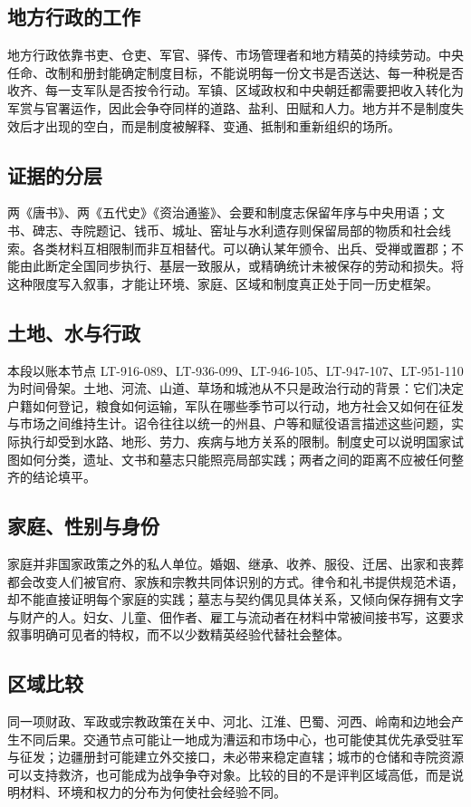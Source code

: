\subsection{地方行政的工作}
地方行政依靠书吏、仓吏、军官、驿传、市场管理者和地方精英的持续劳动。中央任命、改制和册封能确定制度目标，不能说明每一份文书是否送达、每一种税是否收齐、每一支军队是否按令行动。军镇、区域政权和中央朝廷都需要把收入转化为军赏与官署运作，因此会争夺同样的道路、盐利、田赋和人力。地方并不是制度失效后才出现的空白，而是制度被解释、变通、抵制和重新组织的场所。

\subsection{证据的分层}
两《唐书》、两《五代史》《资治通鉴》、会要和制度志保留年序与中央用语；文书、碑志、寺院题记、钱币、城址、窑址与水利遗存则保留局部的物质和社会线索。各类材料互相限制而非互相替代。可以确认某年颁令、出兵、受禅或置郡；不能由此断定全国同步执行、基层一致服从，或精确统计未被保存的劳动和损失。将这种限度写入叙事，才能让环境、家庭、区域和制度真正处于同一历史框架。
\subsection{土地、水与行政}
本段以账本节点 LT-916-089、LT-936-099、LT-946-105、LT-947-107、LT-951-110 为时间骨架。土地、河流、山道、草场和城池从不只是政治行动的背景：它们决定户籍如何登记，粮食如何运输，军队在哪些季节可以行动，地方社会又如何在征发与市场之间维持生计。诏令往往以统一的州县、户等和赋役语言描述这些问题，实际执行却受到水路、地形、劳力、疾病与地方关系的限制。制度史可以说明国家试图如何分类，遗址、文书和墓志只能照亮局部实践；两者之间的距离不应被任何整齐的结论填平。

\subsection{家庭、性别与身份}
家庭并非国家政策之外的私人单位。婚姻、继承、收养、服役、迁居、出家和丧葬都会改变人们被官府、家族和宗教共同体识别的方式。律令和礼书提供规范术语，却不能直接证明每个家庭的实践；墓志与契约偶见具体关系，又倾向保存拥有文字与财产的人。妇女、儿童、佃作者、雇工与流动者在材料中常被间接书写，这要求叙事明确可见者的特权，而不以少数精英经验代替社会整体。

\subsection{区域比较}
同一项财政、军政或宗教政策在关中、河北、江淮、巴蜀、河西、岭南和边地会产生不同后果。交通节点可能让一地成为漕运和市场中心，也可能使其优先承受驻军与征发；边疆册封可能建立外交接口，未必带来稳定直辖；城市的仓储和寺院资源可以支持救济，也可能成为战争争夺对象。比较的目的不是评判区域高低，而是说明材料、环境和权力的分布为何使社会经验不同。

